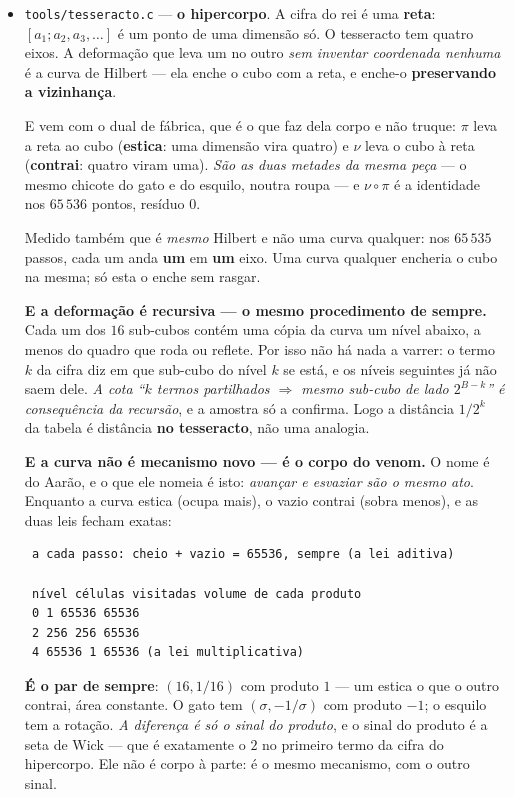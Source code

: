 \documentclass[11pt]{article}
\newcommand{\code}[1]{\texttt{\small #1}}
\theoremstyle{plain}
\theoremstyle{remark}
\begin{document}
\begin{itemize}
\item \code{tools/tesseracto.c} --- \textbf{o hipercorpo}. A cifra do rei é uma \textbf{reta}:
$[a_1;a_2,a_3,\dots]$ é um ponto de uma dimensão só. O tesseracto tem quatro eixos. A deformação
que leva um no outro \emph{sem inventar coordenada nenhuma} é a curva de Hilbert --- ela enche o
cubo com a reta, e enche-o \textbf{preservando a vizinhança}.

E vem com o dual de fábrica, que é o que faz dela corpo e não truque: $\pi$ leva a reta ao cubo
(\textbf{estica}: uma dimensão vira quatro) e $\nu$ leva o cubo à reta (\textbf{contrai}: quatro
viram uma). \emph{São as duas metades da mesma peça} --- o mesmo chicote do gato e do esquilo,
noutra roupa --- e $\nu\circ\pi$ é a identidade nos $65\,536$ pontos, resíduo $0$.

Medido também que é \emph{mesmo} Hilbert e não uma curva qualquer: nos $65\,535$ passos, cada um
anda \textbf{um} em \textbf{um} eixo. Uma curva qualquer encheria o cubo na mesma; só esta o enche
sem rasgar.

\textbf{E a deformação é recursiva --- o mesmo procedimento de sempre.} Cada um dos $16$
sub-cubos contém uma cópia da curva um nível abaixo, a menos do quadro que roda ou reflete. Por
isso não há nada a varrer: o termo $k$ da cifra diz em que sub-cubo do nível $k$ se está, e os
níveis seguintes já não saem dele. \emph{A cota ``$k$ termos partilhados $\Rightarrow$ mesmo
sub-cubo de lado $2^{B-k}$'' é consequência da recursão}, e a amostra só a confirma. Logo a
distância $1/2^k$ da tabela é distância \textbf{no tesseracto}, não uma analogia.

\textbf{E a curva não é mecanismo novo --- é o corpo do venom.} O nome é do Aarão, e o que ele
nomeia é isto: \emph{avançar e esvaziar são o mesmo ato}. Enquanto a curva estica (ocupa mais), o
vazio contrai (sobra menos), e as duas leis fecham exatas:

\begin{verbatim}
 a cada passo: cheio + vazio = 65536, sempre (a lei aditiva)

 nível células visitadas volume de cada produto
 0 1 65536 65536
 2 256 256 65536
 4 65536 1 65536 (a lei multiplicativa)
\end{verbatim}

\textbf{É o par de sempre}: $(16, 1/16)$ com produto $1$ --- um estica o que o outro contrai, área
constante. O gato tem $(\sigma, -1/\sigma)$ com produto $-1$; o esquilo tem a rotação. \emph{A
diferença é só o sinal do produto}, e o sinal do produto é a seta de Wick --- que é exatamente o
$2$ no primeiro termo da cifra do hipercorpo. Ele não é corpo à parte: é o mesmo mecanismo, com o
outro sinal.


\end{itemize}
\end{document}

